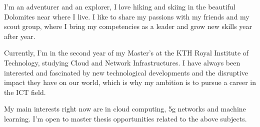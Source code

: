 \documentclass[10pt,a4paper]{altacv}
\begin{document}

\begin{fullwidth}
\makecvheader
\end{fullwidth}




I'm an adventurer and an explorer, I love hiking and skiing in the beautiful Dolomites near where I live.
I like to share my passions with my friends and my scout group, where I bring my competencies as a leader and grow new skills year after year.
\vspace{0.3cm}

Currently, I'm in the second year of my Master's at the KTH Royal Institute of Technology, studying Cloud and Network Infrastructures.
I have always been interested and fascinated by new technological developments and the disruptive impact they have on our world, which is why my ambition is to pursue a career in the ICT field.
\vspace{0.3cm}

My main interests right now are in cloud computing, 5g networks and machine learning. I'm open to master thesis opportunities related to the above subjects.
\vspace{0.3cm}


\end{document}
